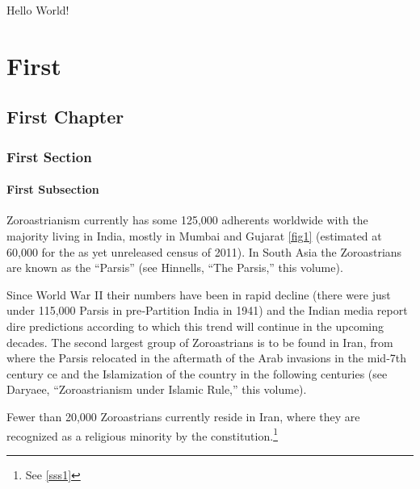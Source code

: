 \documentclass{report}
\begin{document}
Hello World!



\tableofcontents

\listoffigures



\part{First}

\chapter{First Chapter}

\section{First Section}

\subsection*{First Subsection \faAmazon}

Zoroastrianism currently has some 125,000 adherents worldwide with the majority 
living in India, mostly in Mumbai and Gujarat \autoref{fig1} (estimated at 60,000 for the as yet 
unreleased census of 2011). In South Asia the Zoroastrians are known as the “Parsis” 
(see Hinnells, “The Parsis,” this volume).

\noindent Since World War II their numbers have been 
in rapid decline (there were just under 115,000 Parsis in pre‐Partition India in 1941) 
and the Indian media report dire predictions according to which this trend will continue 
in the upcoming decades. The second largest group of Zoroastrians is to be found in 
Iran, from where the Parsis relocated in the aftermath of the Arab invasions in the 
mid‐7th century ce and the Islamization of the country in the following centuries 
\newline
(see Daryaee, “Zoroastrianism under Islamic Rule,” this volume). 

\newpage

Fewer than 20,000 
Zoroastrians currently reside in Iran, where they are recognized as a religious minority 
by the constitution.\footnote{\hypersetup{allcolors=green} See \autoref{sss1}}
\end{document}
